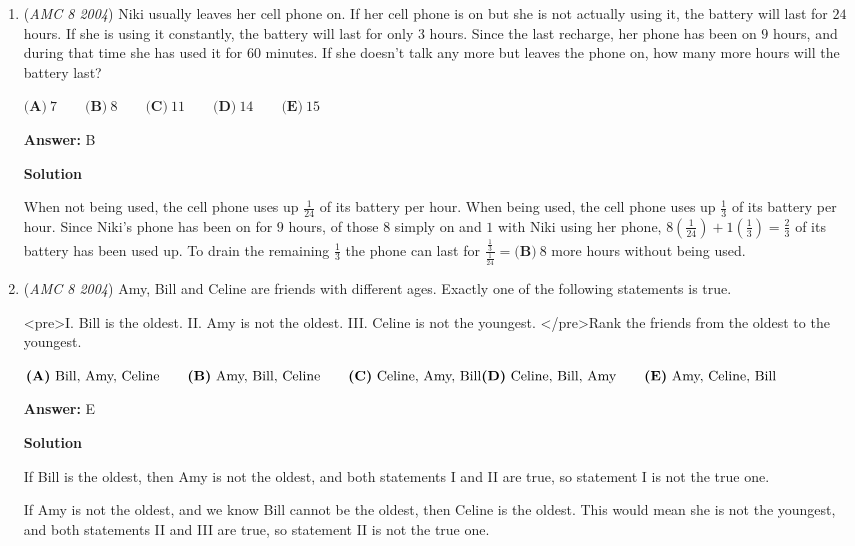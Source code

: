 \begin{enumerate}
	\item (\textit{AMC 8 2004}) Niki usually leaves her cell phone on. If her cell phone is on but
she is not actually using it, the battery will last for $24$ hours. If
she is using it constantly, the battery will last for only $3$ hours.
Since the last recharge, her phone has been on $9$ hours, and during
that time she has used it for $60$ minutes. If she doesn’t talk any
more but leaves the phone on, how many more hours will the battery last?


 $\textbf{(A)}\ 7 \qquad \textbf{(B)}\ 8 \qquad \textbf{(C)}\ 11 \qquad \textbf{(D)}\ 14 \qquad \textbf{(E)}\ 15$

 \textbf{Answer: }B



\textbf{Solution}

When not being used, the cell phone uses up $\frac{1}{24}$ of its battery per hour. When being used, the cell phone uses up $\frac{1}{3}$ of its battery per hour. Since Niki's phone has been on for $9$ hours, of those $8$ simply on and $1$ with Niki using her phone, $8(\frac{1}{24}) + 1(\frac{1}{3}) = \frac{2}{3}$ of its battery has been used up. To drain the remaining $\frac{1}{3}$ the phone can last for $\frac{\frac{1}{3}}{\frac{1}{24}}=\boxed{\textbf{(B)}\ 8}$ more hours without being used.

 


	\item (\textit{AMC 8 2004}) Amy, Bill and Celine are friends with different ages. Exactly one of the following statements is true.


 <pre>I. Bill is the oldest.
II. Amy is not the oldest.
III. Celine is not the youngest.
</pre>Rank the friends from the oldest to the youngest.


 $\textbf{(A)}\ \text{Bill, Amy, Celine}\qquad \textbf{(B)}\ \text{Amy, Bill, Celine}\qquad \textbf{(C)}\ \text{Celine, Amy, Bill}\\ \textbf{(D)}\ \text{Celine, Bill, Amy} \qquad \textbf{(E)}\ \text{Amy, Celine, Bill}$

 \textbf{Answer: }E



\textbf{Solution}

If Bill is the oldest, then Amy is not the oldest, and both statements I and II are true, so statement I is not the true one.

 If Amy is not the oldest, and we know Bill cannot be the oldest, then Celine is the oldest. This would mean she is not the youngest, and both statements II and III are true, so statement II is not the true one.


\end{enumerate}
